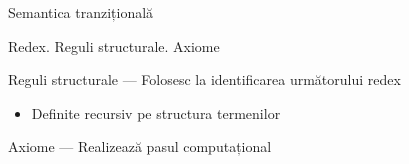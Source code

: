 \documentclass[xcolor=pdftex,romanian,colorlinks]{beamer}
\begin{document}
\begin{section}{Semantica tranzițională}
\begin{frame}{Redex. Reguli structurale. Axiome}
\begin{block}{Reguli structurale --- Folosesc la identificarea următorului redex}
\begin{itemize}
\item Definite recursiv pe structura termenilor
\end{itemize}
\end{block}
\begin{block}{Axiome --- Realizează pasul computațional}
\end{block}
\end{frame}

\end{section}
\end{document}

